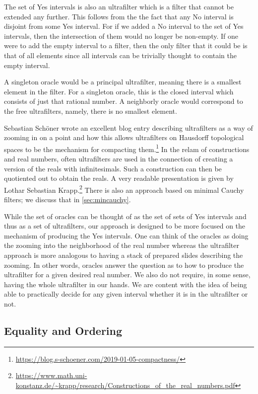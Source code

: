 \documentclass[12pt]{article}
\begin{document}
 The set of Yes intervals is also an ultrafilter which is a filter that cannot be extended any further. This follows from the the fact that any No interval is disjoint from some Yes interval. For if we added a No interval to the set of Yes intervals, then the intersection of them would no longer be non-empty. If one were to add the empty interval to a filter, then the only filter that it could be is that of all elements since all intervals can  be trivially thought to contain the empty interval. 

A singleton oracle would be a principal ultrafilter, meaning there is a smallest element in the filter. For a singleton oracle, this is the closed interval which consists of just that rational number. A neighborly oracle would correspond to the free ultrafilters, namely, there is no smallest element. 

Sebastian Schöner wrote an excellent blog entry describing ultrafilters as a way of zooming in on a point and how this allows ultrafilters on Hausdorff topological spaces to be the mechanism for compacting them.\footnote{\url{https://blog.s-schoener.com/2019-01-05-compactness/}} In the relam of constructions and real numbers, often ultrafilters are used in the connection of creating a version of the reals with infinitesimals. Such a construction can then be quotiented out to obtain the reals. A very readable presentation is given by Lothar Sebastian Krapp.\footnote{\url{https://www.math.uni-konstanz.de/~krapp/research/Constructions_of_the_real_numbers.pdf}} There is also an approach based on minimal Cauchy filters; we discuss that in \ref{sec:mincauchy}.

While the set of oracles can be thought of as the set of sets of Yes intervals and thus as a set of ultrafilters, our approach is designed to be more focused on the mechanism of producing the Yes intervals. One can think of the oracles as doing the zooming into the neighborhood of the real number whereas the ultrafilter approach is more analogous to having a stack of prepared slides describing the zooming. In other words, oracles answer the question as to how to produce the ultrafilter for a given desired real number. We also do not require, in some sense, having the whole ultrafilter in our hands. We are content with the idea of being able to practically decide for any given interval whether it is in the ultrafilter or not.  

\subsection{Equality and Ordering}
\end{document}
